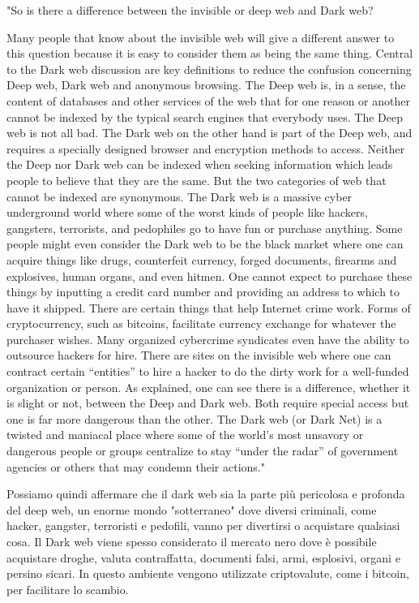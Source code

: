 \newpage
"So is there a difference between the invisible or deep web and Dark web?

Many people that know about the invisible web will give a different answer to this question because it is easy to consider them as being the same thing. Central to the Dark web discussion are key definitions to reduce the confusion concerning Deep web, Dark web and anonymous browsing. The Deep web is, in a sense, the content of databases and other services of the web that for one reason or another cannot be indexed by the typical search engines that everybody uses. The Deep web is not all bad. The Dark web on the other hand is part of the Deep web, and requires a specially designed browser and encryption methods to access. Neither the Deep nor Dark web can be indexed when seeking information which leads people to believe that they are the same. But the two categories of web that cannot be indexed are synonymous. The Dark web is a massive cyber underground world where some of the worst kinds of people like hackers, gangsters, terrorists, and pedophiles go to have fun or purchase anything. Some people might even consider the Dark web to be the black market where one can acquire things like drugs, counterfeit currency, forged documents, firearms and explosives, human organs, and even hitmen. One cannot expect to purchase these things by inputting a credit card number and providing an address to which to have it shipped. There are certain things that help Internet crime work. Forms of cryptocurrency, such as bitcoins, facilitate currency exchange for whatever the purchaser wishes. Many organized cybercrime syndicates even have the ability to outsource hackers for hire. There are sites on the invisible web where one can contract certain “entities” to hire a hacker to do the dirty work for a well-funded organization or person. As explained, one can see there is a difference, whether it is slight or not, between the Deep and Dark web. Both require special access but one is far more dangerous than the other. The Dark web (or Dark Net) is a twisted and maniacal place where some of the world’s most unsavory or dangerous people or groups centralize to stay “under the radar” of government agencies or others that may condemn their actions." \cite{darkweb3}

Possiamo quindi affermare che il dark web sia la parte più pericolosa e profonda del deep web, un enorme mondo "sotterraneo" dove diversi criminali, come hacker, gangster, terroristi e pedofili, vanno per divertirsi o acquistare qualsiasi cosa.
Il Dark web viene spesso considerato il mercato nero dove è possibile acquistare droghe, valuta contraffatta, documenti falsi, armi, esplosivi, organi e persino sicari. In questo ambiente vengono utilizzate criptovalute, come i bitcoin, per facilitare lo scambio.

